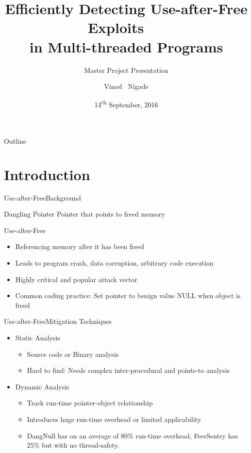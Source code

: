 \documentclass{beamer}
\title{Efficiently Detecting Use-after-Free Exploits \ \ \\in Multi-threaded Programs}
\subtitle{Master Project Presentation}
\author{Vinod ~Nigade}
\institute[VU, Amsterdam] %
{
  Supervised and Guided by: \\
  \texttt{Erik van der Kouwe}, \texttt{Cristiano Giuffrida}  \\
  Vrije University, Amsterdam
}
\date{14\textsuperscript{th} September, 2016}
\begin{document}
\begin{frame}
  \titlepage
\end{frame}

\begin{frame}{Outline}
  \tableofcontents
\end{frame}

\section{Introduction}


\begin{frame}{Use-after-Free}{Background}
\begin{block}{Dangling Pointer}
Pointer that points to freed memory
\end{block}
\begin{block}{Use-after-Free}
\begin{itemize}
\item Referencing memory after it has been freed
\item Leads to program crash, data corruption, arbitrary code execution
\item Highly critical and popular attack vector
\item Common coding practice: Set pointer to benign value NULL when object is freed
\end{itemize}
\end{block}
\end{frame}

\begin{frame}{Use-after-Free}{Mitigation Techniques}
\begin{itemize}
\item Static Analysis \\
\begin{itemize}
\item Source code or Binary analysis 
\item Hard to find: Needs complex inter-procedural and points-to analysis  \\
\end{itemize}
\item Dynamic Analysis \\
\begin{itemize}
\item Track run-time pointer-object relationship
\item Introduces huge run-time overhead or limited applicability
\item DangNull \cite{lee2015dangnull} has on an average of {\color{red}$80\%$} run-time overhead, FreeSentry \cite{younan2015freesentry} has $25\%$ but with {\color{red}no thread-safety}.
\end{itemize}
\end{itemize}

\end{frame}
\end{document}
